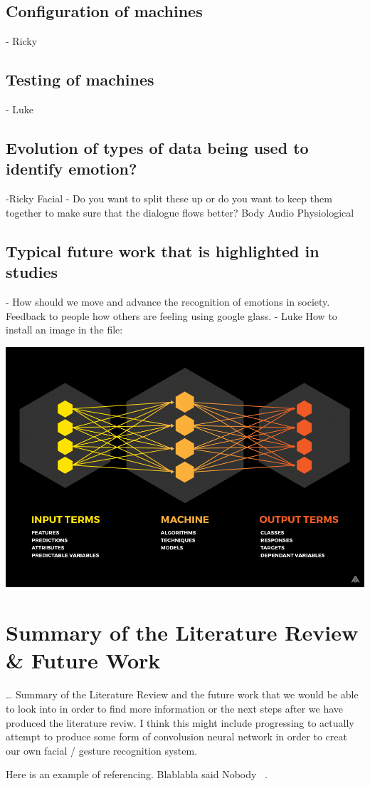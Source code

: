 \documentclass[a4paper, twoside, 11pt]{article}
\begin{document}
	\subsection{Configuration of machines} - Ricky
	\subsection{Testing of machines} - Luke
	\subsection{Evolution of types of data  being used to identify emotion?} -Ricky
	Facial - Do you want to split these up or do you want to keep them together to make sure that the dialogue flows better?
	Body
	Audio
	Physiological
	\subsection{Typical future work that is  highlighted in studies} - How should we move and advance the recognition of  emotions in society. Feedback to people how others are feeling using  google glass. - Luke
	How to install an image in the file:\\
	\begin{center}
	\centering %
	\includegraphics[scale=0.25]{images/understanding-machine-learning} %
	\end{center}
	\section{Summary of the Literature Review \& Future Work}
	\ldots{} Summary of the Literature Review and the future work that we would be able to look into in order to find more information or the next steps after we have produced the literature reviw. I think this might include progressing to actually attempt to produce some form of convolusion neural network in order to creat our own facial / gesture recognition system.
	
	Here is an example of referencing.
	Blablabla said Nobody ~\cite{Nobody06}.
	
	
	{}
	
\end{document}
